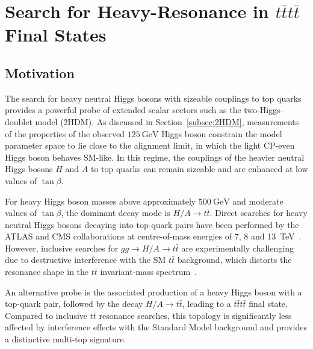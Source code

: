 ﻿%

\chapter{Search for Heavy-Resonance in $t\bar{t}t\bar{t}$ Final States}
\label{chap:BSMtttt}


\section{Motivation}

The search for heavy neutral Higgs bosons with sizeable couplings to
top quarks provides a powerful probe of extended scalar sectors
such as the two-Higgs-doublet model (2HDM). As discussed in
Section~\ref{subsec:2HDM}, measurements of the properties of the
observed $125~\mathrm{GeV}$ Higgs boson constrain the model parameter
space to lie close to the alignment limit, in which the light
CP-even Higgs boson behaves SM-like. In this regime, the couplings of
the heavier neutral Higgs bosons $H$ and $A$ to top quarks can remain
sizeable and are enhanced at low values of $\tan\beta$.

For heavy Higgs boson masses above approximately $500~\mathrm{GeV}$ and
moderate values of $\tan\beta$, the dominant decay mode is
$H/A \rightarrow t\bar{t}$. Direct searches for heavy neutral Higgs
bosons decaying into top-quark pairs have been performed by the ATLAS
and CMS collaborations at centre-of-mass energies of 7, 8 and
13~TeV~\cite{ATLAS:2017snw,CMS:2019pzc,ATLAS:2024vxm}. However, inclusive searches for $gg \to H/A \to t\bar{t}$ are
experimentally challenging due to destructive interference with the
SM $t\bar{t}$ background, which distorts the resonance shape in the
$t\bar{t}$ invariant-mass spectrum~\cite{Gaemers:1984sj,Hajer:2015gka}.

An alternative probe is the associated production of a heavy Higgs
boson with a top-quark pair, followed by the decay $H/A \to t\bar{t}$,
leading to a $t\bar{t}t\bar{t}$ final state. Compared to inclusive
$t\bar{t}$ resonance searches, this topology is significantly less
affected by interference effects with the Standard Model background
and provides a distinctive multi-top signature.

